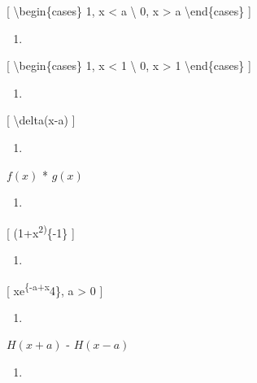 \documentclass[
]{article}
\providecommand{\tightlist}{%
  \setlength{\itemsep}{0pt}\setlength{\parskip}{0pt}}
\begin{document}
{[} \textbackslash begin\{cases\} 1, \textbar x\textbar{} \textless{} a
\textbackslash{} 0, \textbar x\textbar{} \textgreater{} a
\textbackslash end\{cases\} {]}

\begin{enumerate}
\def\labelenumi{\arabic{enumi}.}
\setcounter{enumi}{8}
\tightlist
\item
\end{enumerate}

{[} \textbackslash begin\{cases\} 1, \textbar x\textbar{} \textless{} 1
\textbackslash{} 0, \textbar x\textbar{} \textgreater{} 1
\textbackslash end\{cases\} {]}

\begin{enumerate}
\def\labelenumi{\arabic{enumi}.}
\setcounter{enumi}{9}
\tightlist
\item
\end{enumerate}

{[} \textbackslash delta(x-a) {]}

\begin{enumerate}
\def\labelenumi{\arabic{enumi}.}
\setcounter{enumi}{10}
\tightlist
\item
\end{enumerate}

\(f(x)\) * \(g(x)\)

\begin{enumerate}
\def\labelenumi{\arabic{enumi}.}
\setcounter{enumi}{11}
\tightlist
\item
\end{enumerate}

{[} (1+x\textsuperscript{2)}\{-1\} {]}

\begin{enumerate}
\def\labelenumi{\arabic{enumi}.}
\setcounter{enumi}{12}
\tightlist
\item
\end{enumerate}

{[} xe\textsuperscript{\{-a+x}4\}, a \textgreater{} 0 {]}

\begin{enumerate}
\def\labelenumi{\arabic{enumi}.}
\setcounter{enumi}{13}
\tightlist
\item
\end{enumerate}

\(H(x+a)\) - \(H(x-a)\)

\begin{enumerate}
\def\labelenumi{\arabic{enumi}.}
\setcounter{enumi}{14}
\tightlist
\item
\end{enumerate}
\end{document}

